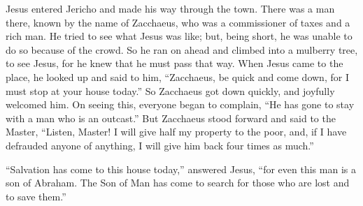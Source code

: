  Jesus entered Jericho and made his way through the town.
 There was a man there, known by the name of Zacchaeus, who
was a commissioner of taxes and a rich man.  He tried to see
what Jesus was like; but, being short, he was unable to do so because of
the crowd.  So he ran on ahead and climbed into a mulberry
tree, to see Jesus, for he knew that he must pass that way. 
When Jesus came to the place, he looked up and said to him, ``Zacchaeus,
be quick and come down, for I must stop at your house today.''
 So Zacchaeus got down quickly, and joyfully welcomed him.
 On seeing this, everyone began to complain, ``He has gone
to stay with a man who is an outcast.''  But Zacchaeus stood
forward and said to the Master, ``Listen, Master! I will give half my
property to the poor, and, if I have defrauded anyone of anything, I
will give him back four times as much.''

 ``Salvation has come to this house today,'' answered Jesus,
``for even this man is a son of Abraham.  The Son of Man
has come to search for those who are lost and to save them.''

